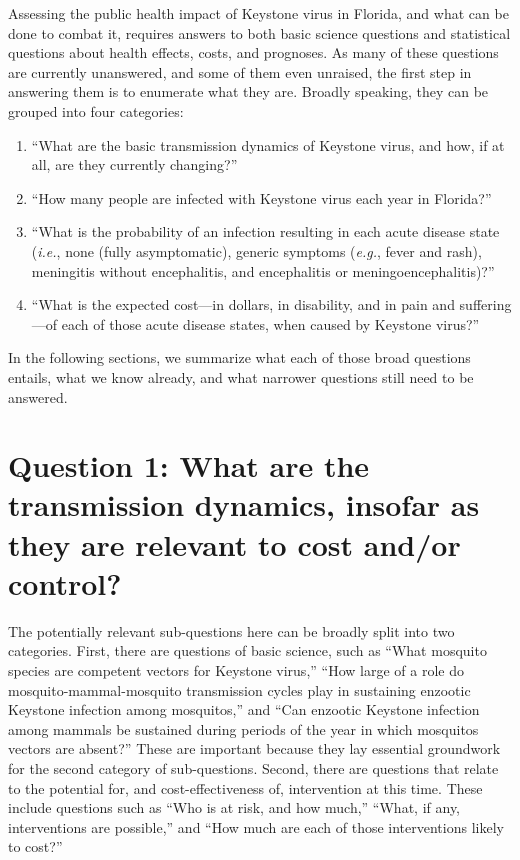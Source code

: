 \documentclass[12pt]{article}
\newcommand{\eg}{\textit{e.g.}}
\newcommand{\ie}{\textit{i.e.}}
\begin{document}
        Assessing the public health impact of Keystone virus in Florida, and what can be done to combat it, requires answers to both basic science questions and statistical questions about health effects, costs, and prognoses. As many of these questions are currently unanswered, and some of them even unraised, the first step in answering them is to enumerate what they are. Broadly speaking, they can be grouped into four categories:
        \begin{enumerate}
            \item ``What are the basic transmission dynamics of Keystone virus, and how, if at all, are they currently changing?''
            \item ``How many people are infected with Keystone virus each year in Florida?''
            \item ``What is the probability of an infection resulting in each acute disease state (\ie, none (fully asymptomatic), generic symptoms (\eg, fever and rash), meningitis without encephalitis, and encephalitis or meningoencephalitis)?''
            \item ``What is the expected cost---in dollars, in disability, and in pain and suffering---of each of those acute disease states, when caused by Keystone virus?''
        \end{enumerate}

        In the following sections, we summarize what each of those broad questions entails, what we know already, and what narrower questions still need to be answered.

    \section[Transmission dynamics]{Question 1: What are the transmission dynamics, insofar as they are relevant to cost and/or control?}
    \label{transmission-dynamics}
        The potentially relevant sub-questions here can be broadly split into two categories. First, there are questions of basic science, such as ``What mosquito species are competent vectors for Keystone virus,'' ``How large of a role do mosquito-mammal-mosquito transmission cycles play in sustaining enzootic Keystone infection among mosquitos,'' and ``Can enzootic Keystone infection among mammals be sustained during periods of the year in which mosquitos vectors are absent?'' These are important because they lay essential groundwork for the second category of sub-questions. Second, there are questions that relate to the potential for, and cost-effectiveness of, intervention at this time. These include questions such as ``Who is at risk, and how much,'' ``What, if any, interventions are possible,'' and ``How much are each of those interventions likely to cost?''
\end{document}
